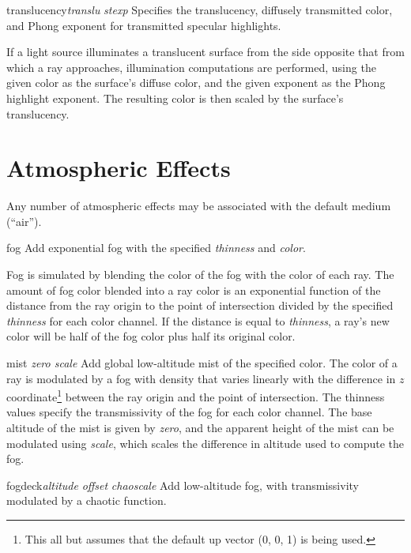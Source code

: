 \begin{defkey}{translucency}{{\em translu}  {\em stexp}}
	Specifies the translucency, diffusely transmitted color,
	and Phong exponent for transmitted specular highlights.
\end{defkey}
If a light source illuminates a translucent surface from the side opposite
that from which a ray approaches, illumination computations are performed,
using the given color as the surface's diffuse color, and the given
exponent as the Phong highlight exponent.  The resulting color is then
scaled by the surface's translucency.

\section{Atmospheric Effects}

Any number of atmospheric effects may be associated with the default
medium (``air'').

\begin{defkey}{fog}{ }
Add exponential fog with the specified {\em thinness} and {\em color}.
\end{defkey}
Fog is simulated by blending the color of the fog with the color of
each ray.  The amount of fog color blended into a ray color is an exponential
function of the distance from the ray origin to the point of intersection
divided by the specified {\em thinness} for each color channel.
If the distance is equal to {\em thinness},
a ray's new color will be half of the fog color plus half its
original color.

\begin{defkey}{mist}{  {\em zero scale}}
Add global low-altitude mist of the specified color.  The color of
a ray is modulated by a fog with density that varies linearly with
the difference in $z$ coordinate\footnote{This all but assumes that
the default up vector (0, 0, 1) is being used.}
between the ray origin and
the point of intersection.  The thinness values specify the transmissivity
of the fog for each color channel.
The base altitude of the
mist is given by {\em zero}, and the apparent height of the mist can
be modulated using {\em scale}, which scales the difference in
altitude used to compute the fog.
\end{defkey}

\begin{defkey}{fogdeck}{{\em altitude} {\em offset}  {\em chaoscale}
  }
Add low-altitude fog, with transmissivity modulated by
a chaotic function.
\end{defkey}


